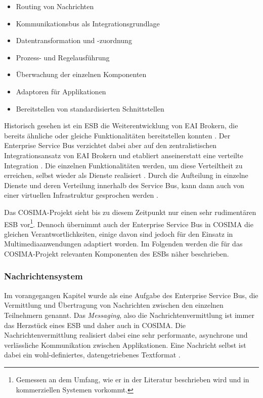   \begin{itemize}
    \item Routing von Nachrichten
    \item Kommunikationsbus als Integrationsgrundlage
    \item Datentransformation und -zuordnung
    \item Prozess- und Regelausführung
    \item Überwachung der einzelnen Komponenten
    \item Adaptoren für Applikationen
    \item Bereitstellen von standardisierten Schnittstellen
  \end{itemize}

  Historisch gesehen ist ein ESB die Weiterentwicklung von EAI Brokern, die bereits ähnliche oder gleiche Funktionalitäten bereitstellen konnten \citep[S. 146]{masak2007ssb}. Der Enterprise Service Bus verzichtet dabei aber auf den zentralistischen Integrationsansatz von EAI Brokern und etabliert anseinerstatt eine verteilte Integration \citep[S. 4]{enterprise_service_bus}. Die einzelnen Funktionalitäten werden, um diese Verteiltheit zu erreichen, selbst wieder als Dienste realisiert  \citep{enterprise_service_bus,masak2007ssb,papazoglou2007soc}. Durch die Aufteilung in einzelne Dienste und deren Verteilung innerhalb des Service Bus, kann dann auch von einer virtuellen Infrastruktur gesprochen werden \citep[S. 136]{soa_goes_real}.
  
  Das COSIMA-Projekt sieht bis zu diesem Zeitpunkt nur einen sehr rudimentären ESB vor\footnote{Gemessen an dem Umfang, wie er in der Literatur beschrieben wird und in kommerziellen Systemen vorkommt.}. Dennoch übernimmt auch der Enterprise Service Bus in COSIMA die gleichen Verantwortlichkeiten, einige davon sind jedoch für den Einsatz in Multimediaanwendungen adaptiert worden. Im Folgenden werden die für das COSIMA-Projekt relevanten Komponenten des ESBs näher beschrieben.
  
\subsubsection{Nachrichtensystem} %
\label{ssub:nachrichtensystem}
  
  Im vorangegangen Kapitel wurde als eine Aufgabe des Enterprise Service Bus, die Vermittlung und Übertragung von Nachrichten zwischen den einzelnen Teilnehmern genannt. Das \emph{Messaging}, also die Nachrichtenvermittlung ist immer das Herzstück eines ESB \citep[S. 77]{enterprise_service_bus} und daher auch in COSIMA. Die Nachrichtenvermittlung realisiert dabei eine sehr performante, asynchrone und verlässliche Kommunikation zwischen Applikationen. Eine Nachricht selbst ist dabei ein wohl-definiertes, datengetriebenes Textformat \citep[S. 60f]{web_services_principles_and_technology}.
  
